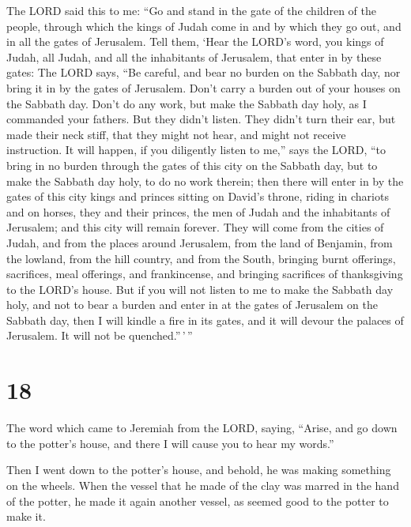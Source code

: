 The LORD said this to me: ``Go and stand in the gate of
the children of the people, through which the kings of Judah come in and
by which they go out, and in all the gates of Jerusalem. 
Tell them, `Hear the LORD's word, you kings of Judah, all Judah, and all
the inhabitants of Jerusalem, that enter in by these gates:
 The LORD says, ``Be careful, and bear no burden on the
Sabbath day, nor bring it in by the gates of Jerusalem. 
Don't carry a burden out of your houses on the Sabbath day. Don't do any
work, but make the Sabbath day holy, as I commanded your fathers.
 But they didn't listen. They didn't turn their ear, but
made their neck stiff, that they might not hear, and might not receive
instruction.  It will happen, if you diligently listen to
me,'' says the LORD, ``to bring in no burden through the gates of this
city on the Sabbath day, but to make the Sabbath day holy, to do no work
therein;  then there will enter in by the gates of this
city kings and princes sitting on David's throne, riding in chariots and
on horses, they and their princes, the men of Judah and the inhabitants
of Jerusalem; and this city will remain forever.  They
will come from the cities of Judah, and from the places around
Jerusalem, from the land of Benjamin, from the lowland, from the hill
country, and from the South, bringing burnt offerings, sacrifices, meal
offerings, and frankincense, and bringing sacrifices of thanksgiving to
the LORD's house.  But if you will not listen to me to
make the Sabbath day holy, and not to bear a burden and enter in at the
gates of Jerusalem on the Sabbath day, then I will kindle a fire in its
gates, and it will devour the palaces of Jerusalem. It will not be
quenched.''\,'\,''

\hypertarget{section-17}{%
\section{18}\label{section-17}}

 The word which came to Jeremiah from the LORD, saying,
 ``Arise, and go down to the potter's house, and there I
will cause you to hear my words.''

 Then I went down to the potter's house, and behold, he
was making something on the wheels.  When the vessel that
he made of the clay was marred in the hand of the potter, he made it
again another vessel, as seemed good to the potter to make it.

